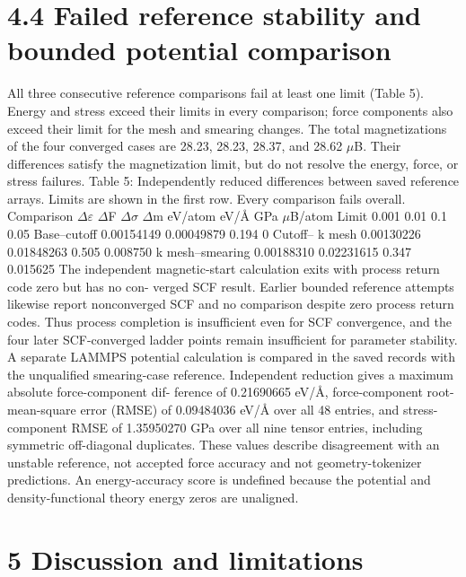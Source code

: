 \documentclass[11pt]{article}
\begin{document}
\section*{4.4 Failed reference stability and bounded potential comparison}

All three consecutive reference comparisons fail at least one limit (Table 5). Energy and stress
exceed their limits in every comparison; force components also exceed their limit for the mesh and
smearing changes. The total magnetizations of the four converged cases are 28.23, 28.23, 28.37, and
28.62 \ensuremath{\mu}B. Their differences satisfy the magnetization limit, but do not resolve the energy, force, or
stress failures.
Table 5: Independently reduced differences between saved reference arrays. Limits are shown in
the first row. Every comparison fails overall.
Comparison \ensuremath{\Delta}\ensuremath{\varepsilon} \ensuremath{\Delta}F \ensuremath{\Delta}\ensuremath{\sigma} \ensuremath{\Delta}m
eV/atom eV/Å GPa \ensuremath{\mu}B/atom
Limit 0.001 0.01 0.1 0.05
Base–cutoff 0.00154149 0.00049879 0.194 0
Cutoff– k mesh 0.00130226 0.01848263 0.505 0.008750
k mesh–smearing 0.00188310 0.02231615 0.347 0.015625
The independent magnetic-start calculation exits with process return code zero but has no con-
verged SCF result. Earlier bounded reference attempts likewise report nonconverged SCF and
no comparison despite zero process return codes. Thus process completion is insufficient even for
SCF convergence, and the four later SCF-converged ladder points remain insufficient for parameter
stability.
A separate LAMMPS potential calculation is compared in the saved records with the unqualified
smearing-case reference. Independent reduction gives a maximum absolute force-component dif-
ference of 0.21690665 eV/Å, force-component root-mean-square error (RMSE) of 0.09484036 eV/Å
over all 48 entries, and stress-component RMSE of 1.35950270 GPa over all nine tensor entries,
including symmetric off-diagonal duplicates. These values describe disagreement with an unstable
reference, not accepted force accuracy and not geometry-tokenizer predictions. An energy-accuracy
score is undefined because the potential and density-functional theory energy zeros are unaligned.

\section*{5 Discussion and limitations}
\end{document}
